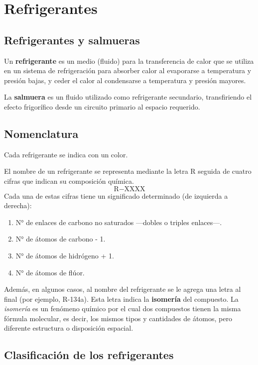 \chapter{Refrigerantes}
\minitoc
\section{Refrigerantes y salmueras}
Un \textbf{refrigerante} es un medio (fluido) para la transferencia de calor que se utiliza en un sistema de refrigeración para absorber calor al evaporarse a temperatura y presión bajas, y ceder el calor al condensarse a temperatura y presión mayores.

La \textbf{salmuera} es un fluido utilizado como refrigerante secundario, transfiriendo el efecto frigorífico desde un circuito primario al espacio requerido.

\section{Nomenclatura}

Cada refrigerante se indica con un color.

El nombre de un refrigerante se representa mediante la letra R seguida de cuatro cifras que indican su composición química. 
\[\text{R}-\text{XXXX}\]
Cada una de estas cifras tiene un significado determinado (de izquierda a derecha):

\begin{enumerate}[label=$X_{\arabic*}$:]
	\item N° de enlaces de carbono no saturados —dobles o triples enlaces—.
	\item N° de átomos de carbono - 1.
	\item N° de átomos de hidrógeno + 1.
	\item N° de átomos de flúor.
\end{enumerate}

Además, en algunos casos, al nombre del refrigerante se le agrega una letra al final (por ejemplo, R-134a). Esta letra indica la \textbf{isomería} del compuesto. La \emph{isomería} es un fenómeno químico por el cual dos compuestos tienen la misma fórmula molecular, es decir, los mismos tipos y cantidades de átomos, pero diferente estructura o disposición espacial.

\section{Clasificación de los refrigerantes}

